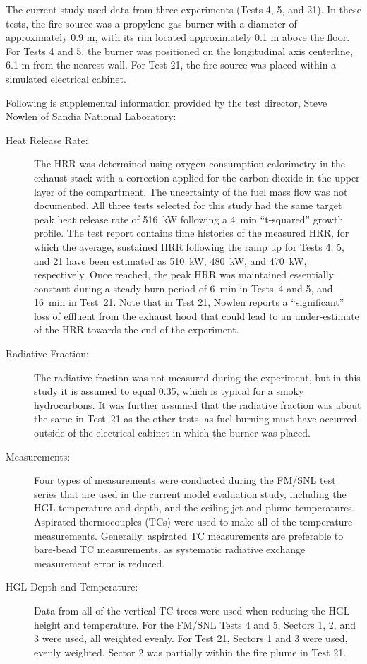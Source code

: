 The current study used data from three experiments (Tests 4, 5, and 21). In these tests, the fire
source was a propylene gas burner with a diameter of approximately 0.9 m, with its rim
located approximately 0.1 m above the floor. For Tests 4 and 5, the burner was positioned on the longitudinal axis centerline, 6.1 m from
the nearest wall. For Test 21, the fire source was placed within a simulated electrical
cabinet.

Following is supplemental information provided by the test director, Steve Nowlen of Sandia National Laboratory:
\begin{description}
\item[Heat Release Rate:] The HRR was determined using oxygen consumption calorimetry in the exhaust stack with
a correction applied for the carbon dioxide in the upper layer of the compartment. The
uncertainty of the fuel mass flow was not documented. All three tests selected for this study had
the same target peak heat release rate of 516~kW following a 4~min ``t-squared'' growth
profile. The test report contains time histories of the measured HRR, for which the average,
sustained HRR following the ramp up for Tests 4, 5, and 21 have been estimated as 510~kW, 480~kW, and 470~kW, respectively.
Once reached, the peak HRR was maintained essentially constant
during a steady-burn period of 6~min in Tests~4 and 5, and 16~min in Test~21. Note that in Test 21, Nowlen reports a
``significant'' loss of effluent from the exhaust hood that could lead to an under-estimate of the HRR towards the end of the experiment.
\item[Radiative Fraction:] The radiative fraction was not measured during the experiment, but
in this study it is assumed to equal 0.35, which is typical for a smoky hydrocarbons.
It was further assumed that the radiative fraction was about the same in
Test~21 as the other tests, as fuel burning must have occurred outside of the electrical cabinet in
which the burner was placed.
\item[Measurements:] Four types of measurements were conducted during the FM/SNL test series that are used in the
current model evaluation study, including the HGL temperature and depth, and the ceiling jet and
plume temperatures. Aspirated thermocouples (TCs) were used to make all of the temperature
measurements. Generally, aspirated TC measurements are preferable to bare-bead TC measurements,
as systematic radiative exchange measurement error is reduced.
\item[HGL Depth and Temperature:] Data from all of the vertical TC trees were used when reducing
the HGL height and temperature. For the FM/SNL Tests 4 and 5, Sectors 1, 2, and 3 were used,
all weighted evenly. For Test 21, Sectors 1 and 3 were used, evenly weighted. Sector 2 was
partially within the fire plume in Test 21.
\end{description}

